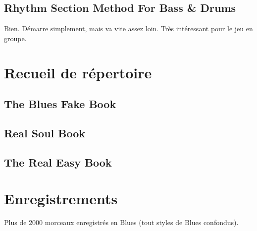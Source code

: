 \documentclass[a4paper]{book}
\begin{document}
\section{Rhythm Section Method For Bass \& Drums}
Bien. Démarre simplement, mais va vite assez loin. Très intéressant pour le jeu en groupe.

\clearpage\chapter[Recueil de r\'epertoire]{Recueil de r\'epertoire}
\section{The Blues Fake Book}
\section{Real Soul Book}
\section{The Real Easy Book}


\clearpage\chapter{Enregistrements}
Plus de 2000 morceaux enregistr\'es en Blues (tout styles de Blues confondus).
\end{document}
